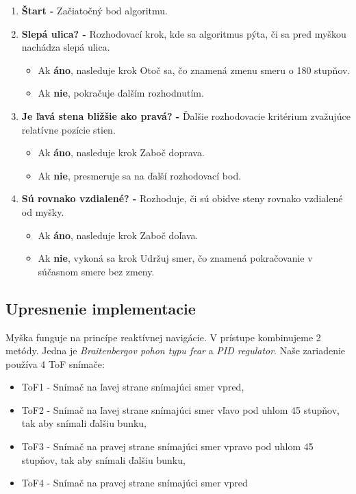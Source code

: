 \begin{enumerate}
    \item \textbf{Štart - }Začiatočný bod algoritmu.
    \item \textbf{Slepá ulica? - }Rozhodovací krok, kde sa algoritmus pýta, či sa pred myškou nachádza slepá ulica.
        \begin{itemize}
            \item Ak \textbf{áno}, nasleduje krok Otoč sa, čo znamená zmenu smeru o 180 stupňov.
            \item Ak \textbf{nie}, pokračuje ďalším rozhodnutím.
        \end{itemize}
    \item \textbf{Je ľavá stena bližšie ako pravá? - }Ďalšie rozhodovacie kritérium zvažujúce relatívne pozície stien.
        \begin{itemize}
            \item Ak \textbf{áno}, nasleduje krok Zaboč doprava.
            \item Ak \textbf{nie}, presmeruje sa na ďalší rozhodovací bod.
        \end{itemize}
    \item \textbf{Sú rovnako vzdialené? - }Rozhoduje, či sú obidve steny rovnako vzdialené od myšky.
        \begin{itemize}
            \item Ak \textbf{áno}, nasleduje krok Zaboč doľava.
            \item Ak \textbf{nie}, vykoná sa krok Udržuj smer, čo znamená pokračovanie v súčasnom smere bez zmeny.
        \end{itemize}
\end{enumerate}
\subsection{Upresnenie implementacie}
\label{subsec:upresnennie_implementacie}

Myška funguje na princípe reaktívnej navigácie. V prístupe kombinujeme 2 metódy. Jedna je \textit{Braitenbergov pohon
typu fear} a
\textit{PID regulator}. Naše zariadenie používa 4 ToF snímače:
\begin{itemize}
	\item ToF1 - Snímač na ľavej strane snímajúci smer vpred,
	\item ToF2 - Snímač na ľavej strane snímajúci smer vľavo pod uhlom 45 stupňov, tak aby snímali ďalšiu bunku,
	\item ToF3 - Snímač na pravej strane snímajúci smer vpravo pod uhlom 45 stupňov, tak aby snímali ďalšiu bunku,
	\item ToF4 - Snímač na pravej strane snímajúci smer vpred
\end{itemize}



